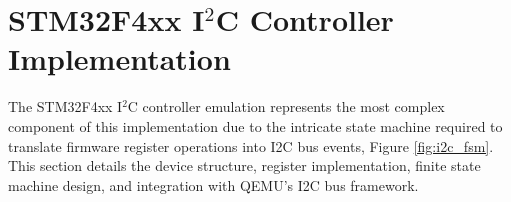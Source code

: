 \section{\texorpdfstring{STM32F4xx I$^2$C Controller Implementation}{STM32F4xx I2C Controller Implementation}}

\label{sec:impl_i2c}

The STM32F4xx I$^2$C controller emulation represents the most complex component of this implementation due to the intricate state machine required to translate firmware register operations into I2C bus events, Figure \ref{fig:i2c_fsm}. This section details the device structure, register implementation, finite state machine design, and integration with QEMU's I2C bus framework.






